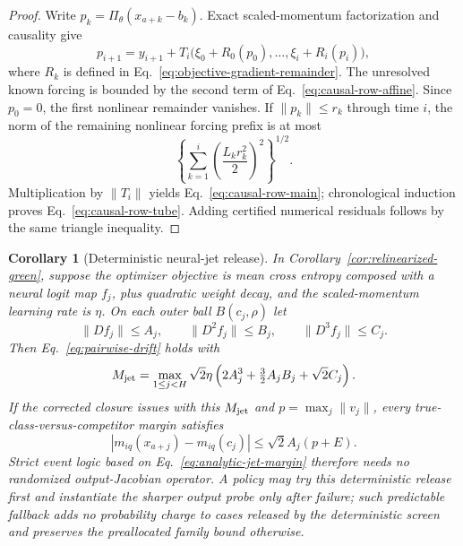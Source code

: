 \documentclass{article}
\newtheorem{corollary}{Corollary}
\begin{document}
\begin{proof}
Write $p_k=\Pi_\theta(x_{a+k}-b_k)$.  Exact scaled-momentum factorization and
causality give
\begin{equation}
 p_{i+1}=y_{i+1}+T_i\bigl(
 \xi_0+R_0(p_0),\ldots,\xi_i+R_i(p_i)\bigr),
 \label{eq:causal-row-identity}
\end{equation}
where $R_k$ is defined in
Eq.~\eqref{eq:objective-gradient-remainder}.  The unresolved known forcing is
bounded by the second term of Eq.~\eqref{eq:causal-row-affine}.  Since $p_0=0$,
the first nonlinear remainder vanishes.  If $\|p_k\|\le r_k$ through time $i$,
the norm of the remaining nonlinear forcing prefix is at most
\begin{equation}
 \left\{\sum_{k=1}^{i}
 \left(\frac{L_kr_k^2}{2}\right)^2\right\}^{1/2}.
\end{equation}
Multiplication by $\|T_i\|$ yields Eq.~\eqref{eq:causal-row-main}; chronological
induction proves Eq.~\eqref{eq:causal-row-tube}.  Adding certified numerical
residuals follows by the same triangle inequality.
\end{proof}

\begin{corollary}[Deterministic neural-jet release]
\label{cor:analytic-jet-release}
In Corollary~\ref{cor:relinearized-green}, suppose the optimizer objective is
mean cross entropy composed with a neural logit map $f_j$, plus quadratic
weight decay, and the scaled-momentum learning rate is $\eta$.  On each outer
ball $B(c_j,\rho)$ let
\begin{equation}
 \|Df_j\|\le A_j,\qquad \|D^2f_j\|\le B_j,
 \qquad \|D^3f_j\|\le C_j.
 \label{eq:analytic-jet-envelope}
\end{equation}
Then Eq.~\eqref{eq:pairwise-drift} holds with
\begin{equation}
 M_{\rm jet}=\max_{1\le j<H}\sqrt2\eta
 \left(2A_j^3+\tfrac32A_jB_j+\sqrt2C_j\right).
 \label{eq:analytic-jet-M}
\end{equation}
If the corrected closure issues with this $M_{\rm jet}$ and
$p=\max_j\|v_j\|$, every true-class-versus-competitor margin satisfies
\begin{equation}
 |m_{iq}(x_{a+j})-m_{iq}(c_j)|
 \le \sqrt2 A_j(p+E).
 \label{eq:analytic-jet-margin}
\end{equation}
Strict event logic based on Eq.~\eqref{eq:analytic-jet-margin} therefore needs
no randomized output-Jacobian operator.  A policy may try this deterministic
release first and instantiate the sharper output probe only after failure;
such predictable fallback adds no probability charge to cases released by the
deterministic screen and preserves the preallocated family bound otherwise.
\end{corollary}
\end{document}

